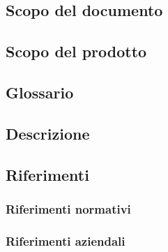\documentclass[../norme-di-progetto.tex]{subfiles}
\begin{document}
\subsection{Scopo del documento}
\subsection{Scopo del prodotto}
\subsection{Glossario}
\subsection{Descrizione}
\subsection{Riferimenti}
\subsubsection{Riferimenti normativi}
\subsubsection{Riferimenti aziendali}
\end{document}
